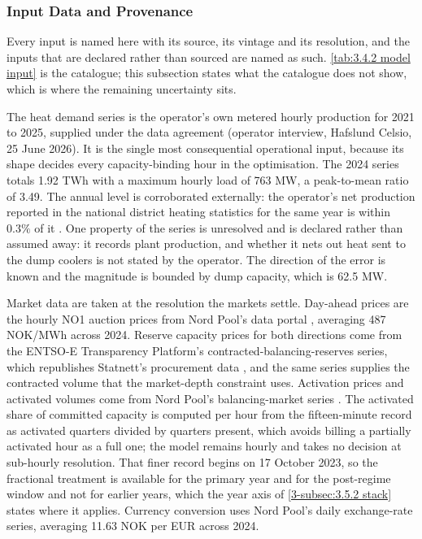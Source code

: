 \subsubsection{Input Data and Provenance}
\label{3-subsec:3.4.2 input data provenance}

Every input is named here with its source, its vintage and its resolution, and the inputs that are declared rather than sourced are named as such. \autoref{tab:3.4.2 model input} is the catalogue; this subsection states what the catalogue does not show, which is where the remaining uncertainty sits.

The heat demand series is the operator's own metered hourly production for 2021 to 2025, supplied under the data agreement (operator interview, Hafslund Celsio, 25 June 2026). It is the single most consequential operational input, because its shape decides every capacity-binding hour in the optimisation. The 2024 series totals 1.92 TWh with a maximum hourly load of 763 MW, a peak-to-mean ratio of 3.49. The annual level is corroborated externally: the operator's net production reported in the national district heating statistics for the same year is within $0.3\%$ of it \cite{norsk_fjernvarme_fjernkontrollenno_nodate}. One property of the series is unresolved and is declared rather than assumed away: it records plant production, and whether it nets out heat sent to the dump coolers is not stated by the operator. The direction of the error is known and the magnitude is bounded by dump capacity, which is 62.5 MW.

Market data are taken at the resolution the markets settle. Day-ahead prices are the hourly NO1 auction prices from Nord Pool's data portal \cite{nord_pool_nord_nodate}, averaging 487 NOK/MWh across 2024. Reserve capacity prices for both directions come from the ENTSO-E Transparency Platform's contracted-balancing-reserves series, which republishes Statnett's procurement data \cite{entsoe_entsoe_nodate}, and the same series supplies the contracted volume that the market-depth constraint uses. Activation prices and activated volumes come from Nord Pool's balancing-market series \cite{nord_pool_nord_nodate}. The activated share of committed capacity is computed per hour from the fifteen-minute record as activated quarters divided by quarters present, which avoids billing a partially activated hour as a full one; the model remains hourly and takes no decision at sub-hourly resolution. That finer record begins on 17 October 2023, so the fractional treatment is available for the primary year and for the post-regime window and not for earlier years, which the year axis of \autoref{3-subsec:3.5.2 stack} states where it applies. Currency conversion uses Nord Pool's daily exchange-rate series, averaging 11.63 NOK per EUR across 2024.

